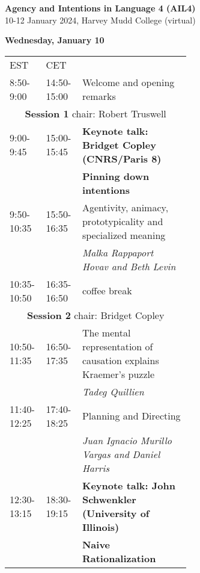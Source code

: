 \documentclass[11pt]{article}
\title{}
\author{}
\date{}
\begin{document}

\textbf{\Large{Agency and Intentions in Language 4 (AIL4)}} \\
10-12 January 2024, Harvey Mudd College (virtual) \\[-7pt]
\makebox[\linewidth]{\rule{\textwidth}{0.4pt}}

\vspace{1cm}

\textbf{Wednesday, January 10}\\[7pt]
\begin{tabular}{ll p{0.6\linewidth}}
EST	& CET &  \\
\rowcolor{gray!30}
8:50-9:00 & 14:50-15:00 & Welcome and opening remarks\\
\multicolumn{3}{c}{{\bf Session 1} chair: Robert Truswell } \\
\hline
9:00-9:45  & 15:00-15:45 & \textbf{Keynote talk: Bridget Copley (CNRS/Paris 8)} \\
&& \textbf{Pinning down intentions }\\
\hline
9:50-10:35  & 15:50-16:35   & Agentivity, animacy, prototypicality and specialized meaning\\
&& \textit{Malka Rappaport Hovav and Beth Levin} \\
\rowcolor{gray!30}
10:35-10:50 & 16:35-16:50   & coffee break \\
\multicolumn{3}{c}{{\bf Session 2} chair: Bridget Copley}\\
\hline
10:50-11:35 & 16:50-17:35   & The mental representation of causation explains Kraemer's puzzle\\
&& \textit{Tadeg Quillien} \\
\hline
11:40-12:25 & 17:40-18:25   & Planning and Directing \\
&&\textit{Juan Ignacio Murillo Vargas and Daniel Harris} \\
\hline
12:30-13:15 & 18:30-19:15   & \textbf{Keynote talk: John Schwenkler (University of Illinois) }\\
&& \textbf{Naive Rationalization}\\
\end{tabular}

\vspace{2cm}
\end{document}
